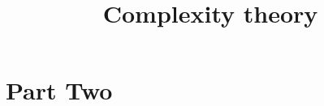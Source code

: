 



\title{Complexity theory}


\maketitle

\label{section-phantom}

\tableofcontents


\part{Part Two}
\label{book-part-two}







